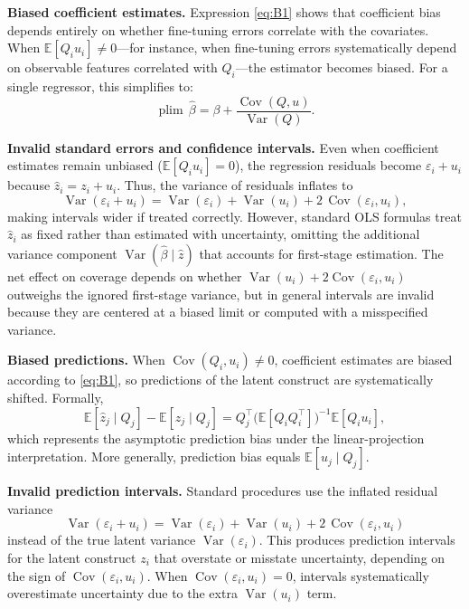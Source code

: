 \documentclass[11pt]{article}
\begin{document}
\textbf{Biased coefficient estimates.}  
Expression \eqref{eq:B1} shows that coefficient bias depends entirely on whether fine-tuning errors correlate with the covariates.  
When $\mathbb{E}[Q_i u_i] \neq 0$—for instance, when fine-tuning errors systematically depend on observable features correlated with $Q_i$—the estimator becomes biased.  
For a single regressor, this simplifies to:
\begin{equation}
\operatorname{plim}\,\hat{\beta} 
= \beta + \frac{\operatorname{Cov}(Q,u)}{\operatorname{Var}(Q)}.
\tag{B2}\label{eq:B2}
\end{equation}

\textbf{Invalid standard errors and confidence intervals.}  
Even when coefficient estimates remain unbiased ($\mathbb{E}[Q_i u_i]=0$), the regression residuals become $\varepsilon_i+u_i$ because $\hat{z}_i=z_i+u_i$.  
Thus, the variance of residuals inflates to
\[
\operatorname{Var}(\varepsilon_i+u_i) 
= \operatorname{Var}(\varepsilon_i) + \operatorname{Var}(u_i) + 2\,\operatorname{Cov}(\varepsilon_i,u_i),
\]
making intervals wider if treated correctly.  
However, standard OLS formulas treat $\hat{z}_i$ as fixed rather than estimated with uncertainty, omitting the additional variance component 
$\operatorname{Var}(\hat{\beta}\mid \hat{z})$ that accounts for first-stage estimation.  
The net effect on coverage depends on whether $\operatorname{Var}(u_i)+2\operatorname{Cov}(\varepsilon_i,u_i)$ outweighs the ignored first-stage variance,  
but in general intervals are invalid because they are centered at a biased limit or computed with a misspecified variance.

\textbf{Biased predictions.}  
When $\operatorname{Cov}(Q_i,u_i)\neq 0$, coefficient estimates are biased according to \eqref{eq:B1}, so predictions of the latent construct are systematically shifted.  
Formally,
\[
\mathbb{E}[\hat{z}_j \mid Q_j] - \mathbb{E}[z_j \mid Q_j] 
= Q_j^\top \big(\mathbb{E}[Q_i Q_i^\top]\big)^{-1}\mathbb{E}[Q_i u_i],
\]
which represents the asymptotic prediction bias under the linear-projection interpretation.  
More generally, prediction bias equals $\mathbb{E}[u_j \mid Q_j]$.

\textbf{Invalid prediction intervals.}  
Standard procedures use the inflated residual variance 
\[
\operatorname{Var}(\varepsilon_i+u_i) 
= \operatorname{Var}(\varepsilon_i) + \operatorname{Var}(u_i) + 2\,\operatorname{Cov}(\varepsilon_i,u_i)
\]
instead of the true latent variance $\operatorname{Var}(\varepsilon_i)$.  
This produces prediction intervals for the latent construct $z_i$ that overstate or misstate uncertainty, depending on the sign of $\operatorname{Cov}(\varepsilon_i,u_i)$.  
When $\operatorname{Cov}(\varepsilon_i,u_i)=0$, intervals systematically overestimate uncertainty due to the extra $\operatorname{Var}(u_i)$ term.
\end{document}

